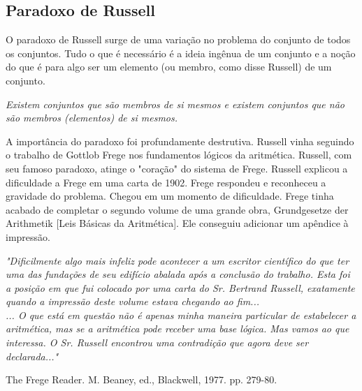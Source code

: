    \subsection{Paradoxo de Russell}
      O paradoxo de Russell surge de uma variação no problema do conjunto 
      de todos os conjuntos. Tudo o que é necessário é a ideia ingênua de um 
      conjunto e a noção do que é para algo ser um elemento (ou membro, 
      como disse Russell) de um conjunto.
      \begin{center}
         \emph{Existem conjuntos que são membros de si mesmos e existem 
         conjuntos que não são membros (elementos) de si mesmos.}
      \end{center}
      A importância do paradoxo foi profundamente destrutiva. Russell vinha 
      seguindo o trabalho de Gottlob Frege nos fundamentos lógicos da aritmética. 
      Russell, com seu famoso paradoxo, atinge o "coração" do sistema de Frege.
      Russell explicou a dificuldade a Frege em uma carta de 1902. Frege 
      respondeu e reconheceu a gravidade do problema. Chegou em um momento de 
      dificuldade. Frege tinha acabado de completar o segundo volume de uma 
      grande obra, Grundgesetze der Arithmetik [Leis Básicas da Aritmética]. 
      Ele conseguiu adicionar um apêndice à impressão.
      \begin{Center}
         \textit{"Dificilmente algo mais infeliz pode acontecer a um escritor 
         científico do que ter uma das fundações de seu edifício abalada após a 
         conclusão do trabalho. Esta foi a posição em que fui colocado por uma carta do 
         Sr. Bertrand Russell, exatamente quando a impressão deste volume estava 
         chegando ao fim... \\
         ... O que está em questão não é apenas minha maneira particular de 
         estabelecer a aritmética, mas se a aritmética pode receber uma base lógica. 
         Mas vamos ao que interessa. O Sr. Russell encontrou uma contradição que agora 
         deve ser declarada..."}
         \begin{flushright}
            The Frege Reader. M. Beaney, ed., Blackwell, 1977. pp. 279-80.
         \end{flushright}
      \end{Center}
